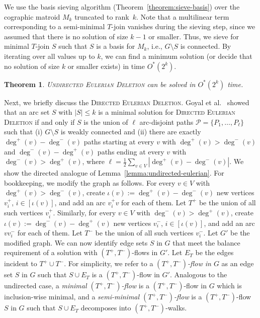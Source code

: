 \documentclass[10pt,a4paper]{article}
\newtheorem{theorem}{Theorem}[section]
\newcommand{\cP}{\ensuremath{\mathcal P}\xspace}
\begin{document}
We use the basis sieving algorithm (Theorem~\ref{theorem:sieve-basis}) over the cographic matroid $M_k$ truncated to rank~$k$.
Note that a multilinear term corresponding to a semi-minimal $T$-join vanishes during the sieving step, since we assumed that there is no solution of size $k - 1$ or smaller.
Thus, we sieve for minimal $T$-join $S$ such that $S$ is a basis for $M_k$, i.e., $G \setminus S$ is connected.
By iterating over all values up to $k$, we can find a minimum solution (or decide that no solution of size $k$ or smaller exists) in time $O^*(2^k)$.

\begin{theorem}
  \textsc{Undirected Eulerian Deletion} can be solved in $O^*(2^{k})$ time.
\end{theorem}

Next, we briefly discuss the \textsc{Directed Eulerian Deletion}.
Goyal et al.~\cite{GoyalMPPS18even} showed that an arc set $S$ with $|S| \le k$ is a minimal solution for \textsc{Directed Eulerian Deletion} if and only if $S$ is the union of $\ell$ arc-disjoint paths $\cP = \{ P_1, \dots, P_{\ell} \}$ such that (i) $G \setminus S$ is weakly connected and (ii) there are exactly $\deg^+(v) - \deg^-(v)$ paths starting at every $v$ with $\deg^+(v) > \deg^-(v)$ and $\deg^-(v) - \deg^+(v)$ paths ending at every $v$ with $\deg^-(v) > \deg^+(v)$, where $\ell = \frac{1}{2} \sum_{v \in V} |\deg^+(v) - \deg^-(v)|$.
We show the directed analogue of Lemma~\ref{lemma:undirected-eulerian}.
For bookkeeping, we modify the graph as follows. For every $v \in V$ with $\deg^+(v)>\deg^-(v)$, create
$\iota(v):=\deg^+(v)-\deg^-(v)$ new vertices $v_i^+$, $i \in [\iota(v)]$, and add an arc $v_i^+v$ for each of them.
Let $T^+$ be the union of all such vertices $v_i^+$. 
Similarly, for every $v \in V$ with $\deg^-(v)>\deg^+(v)$, create
$\iota(v) := \deg^-(v)-\deg^+(v)$ new vertices $v_i^-$, $i \in [\iota(v)]$, and add an arc $vv_i^-$ for each of them.
Let $T^-$ be the union of all such vertices $v_i^-$. 
Let $G'$ be the modified graph. We can now identify edge sets $S$ in $G$ that meet the balance requirement 
of a solution with $(T^+,T^-)$-flows in $G'$. Let $E_T$ be the edges incident to $T^+ \cup T^-$. 
For simplicity, we refer to a \emph{$(T^+,T^-)$-flow in $G$} as an edge set $S$ in $G$
such that $S \cup E_T$ is a $(T^+,T^-)$-flow in $G'$. Analogous to the undirected case,
a \emph{minimal $(T^+,T^-)$-flow} is a $(T^+, T^-)$-flow in $G$ which is inclusion-wise minimal,
and a \emph{semi-minimal $(T^+,T^-)$-flow} is a $(T^+,T^-)$-flow $S$ in $G$ such that $S \cup E_T$
decomposes into $(T^+,T^-)$-walks.
\end{document}
